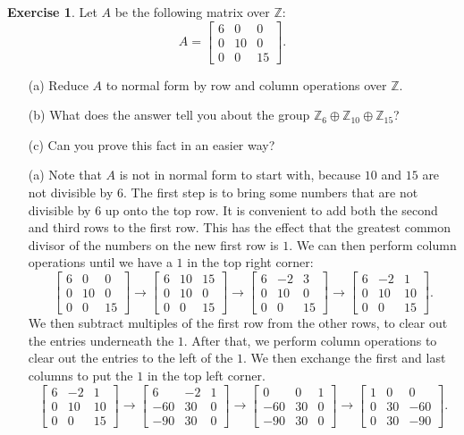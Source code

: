 \documentclass{amsart}
\newcommand{\bbm}       {\left[\begin{matrix}}
\newcommand{\ebm}       {\end{matrix}\right]}
\newcommand{\Z}         {{\mathbb{Z}}}
\newcommand{\xra}       {\xrightarrow}
\newcommand{\ip}[1]     {\langle #1\rangle}
\newcommand{\op}        {\oplus}
\renewcommand{\:}{\colon}
\theoremstyle{definition}
\newtheorem{exercise}{Exercise}[section]
\renewenvironment{solution}{\SolutionAtEnd}{\endSolutionAtEnd}
\begin{document}
\begin{exercise}
 Let $A$ be the following matrix over $\Z$:
 \[ A = \bbm 6&0&0 \\ 0&10&0 \\ 0&0&15 \ebm. \]
 \begin{itemize}
  \item[(a)] Reduce $A$ to normal form by row and column operations
   over $\Z$.
  \item[(b)] What does the answer tell you about the group
   $\Z_6\op\Z_{10}\op\Z_{15}$?
  \item[(c)] Can you prove this fact in an easier way?
 \end{itemize}
\end{exercise}
\begin{solution}
 \begin{itemize}
  \item[(a)] Note that $A$ is not in normal form to start with,
   because $10$ and $15$ are not divisible by $6$.  The first step is
   to bring some numbers that are not divisible by $6$ up onto the top
   row.  It is convenient to add both the second and third rows to the
   first row.  This has the effect that the greatest common divisor of
   the numbers on the new first row is $1$.  We can then perform
   column operations until we have a $1$ in the top right corner:
   \[ \bbm 6&0&0\\0&10&0\\0&0&15\ebm \xra{}
      \bbm 6&10&15\\0&10&0\\0&0&15\ebm \xra{}
      \bbm 6&-2&3\\0&10&0\\0&0&15\ebm \xra{}
      \bbm 6&-2&1\\0&10&10\\0&0&15\ebm.
   \]
   We then subtract multiples of the first row from the other rows, to
   clear out the entries underneath the $1$.  After that, we perform
   column operations to clear out the entries to the left of the $1$.
   We then exchange the first and last columns to put the $1$ in the
   top left corner.
   \[ \bbm 6&-2&1\\0&10&10\\0&0&15\ebm \xra{}
      \bbm 6&-2&1\\-60&30&0\\-90&30&0\ebm \xra{}
      \bbm 0&0&1\\-60&30&0\\-90&30&0\ebm \xra{}
      \bbm 1&0&0\\0&30&-60\\0&30&-90\ebm. 
\]
\end{itemize}
\end{solution}
\end{document}

